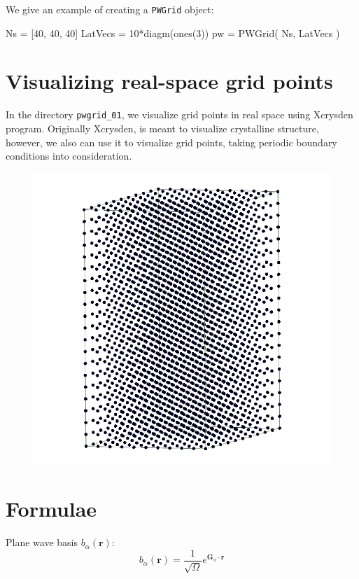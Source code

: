 \documentclass[a4paper,11pt]{extarticle}
\begin{document}
We give an example of creating a {\tt PWGrid} object:
\begin{juliacode}
Ns = [40, 40, 40]
LatVecs = 10*diagm(ones(3))
pw = PWGrid( Ns, LatVecs )
\end{juliacode}


\section{Visualizing real-space grid points}

In the directory \verb|pwgrid_01|, we visualize grid points in real space
using Xcrysden program. Originally Xcrysden, is meant to visualize crystalline structure,
however, we also can use it to visualize grid points, taking periodic boundary
conditions into consideration.

\begin{figure}
\centering
\includegraphics[scale=0.25]{images/R_grid_hexagonal.png}
\par
\end{figure}

\section{Formulae}

Plane wave basis $b_{\alpha}(\mathbf{r})$:
\begin{equation}
b_{\alpha}(\mathbf{r}) = \frac{1}{\sqrt{\Omega}} e^{\mathbf{G}_{\alpha}\cdot\mathbf{r}}
\end{equation}
\end{document}
